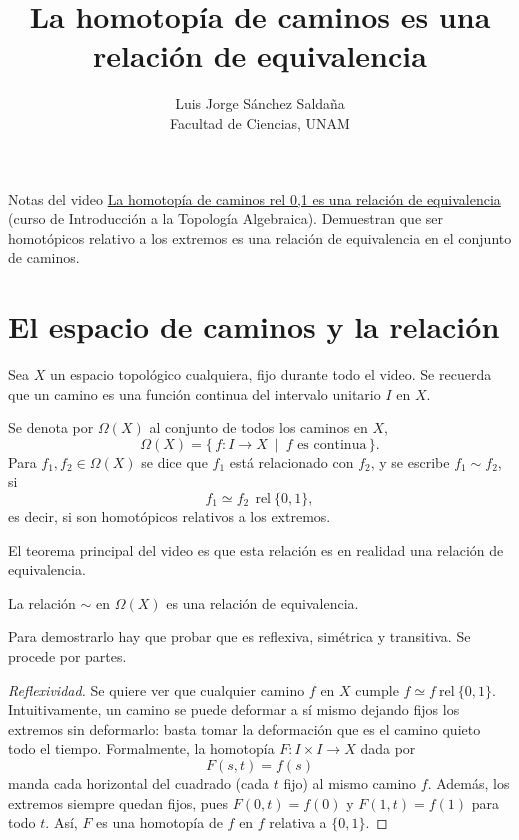 \documentclass[11pt]{article}
\title{La homotopía de caminos es una relación de equivalencia}
\author{Luis Jorge Sánchez Saldaña\\[2pt]\small Facultad de Ciencias, UNAM}
\date{}
\begin{document}
\maketitle

\noindent\small Notas del video
\href{https://www.youtube.com/watch?v=qFL_OneuFwI}{\guillemotleft{}La homotopía de caminos rel 0,1 es una relación de equivalencia\guillemotright{}}
(curso de Introducción a la Topología Algebraica). Demuestran que ser homotópicos relativo a los extremos es una relación de equivalencia en el conjunto de caminos.
\normalsize

\section*{El espacio de caminos y la relación}

Sea $X$ un espacio topológico cualquiera, fijo durante todo el video. Se recuerda que un camino es una función continua del intervalo unitario $I$ en $X$.

\begin{defn}
Se denota por $\Omega(X)$ al conjunto de todos los caminos en $X$,
\[
  \Omega(X)=\{\,f\colon I\to X\ \mid\ f \text{ es continua}\,\}.
\]
Para $f_1,f_2\in\Omega(X)$ se dice que $f_1$ está relacionado con $f_2$, y se escribe $f_1\sim f_2$, si
\[
  f_1\simeq f_2\ \ \mathrm{rel}\ \{0,1\},
\]
es decir, si son homotópicos relativos a los extremos.
\end{defn}

El teorema principal del video es que esta relación es en realidad una relación de equivalencia.

\begin{prop}
La relación $\sim$ en $\Omega(X)$ es una relación de equivalencia.
\end{prop}

Para demostrarlo hay que probar que es reflexiva, simétrica y transitiva. Se procede por partes.

\begin{proof}[Reflexividad]
Se quiere ver que cualquier camino $f$ en $X$ cumple $f\simeq f\ \mathrm{rel}\ \{0,1\}$. Intuitivamente, un camino se puede deformar a sí mismo dejando fijos los extremos sin deformarlo: basta tomar la deformación que es el camino quieto todo el tiempo. Formalmente, la homotopía $F\colon I\times I\to X$ dada por
\[
  F(s,t)=f(s)
\]
manda cada horizontal del cuadrado (cada $t$ fijo) al mismo camino $f$. Además, los extremos siempre quedan fijos, pues $F(0,t)=f(0)$ y $F(1,t)=f(1)$ para todo $t$. Así, $F$ es una homotopía de $f$ en $f$ relativa a $\{0,1\}$.
\end{proof}
\end{document}
